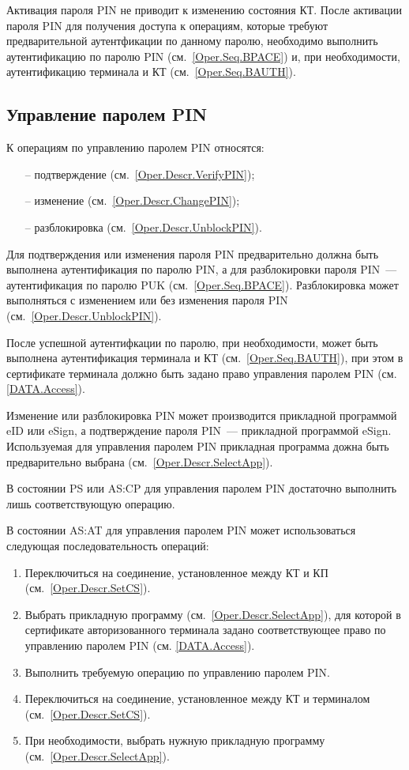 Активация пароля PIN не приводит к изменению состояния КТ.
После активации пароля PIN для получения доступа к
операциям, которые требуют предварительной
аутентфикации по данному паролю, необходимо выполнить аутентификацию 
по паролю PIN (см.~\ref{Oper.Seq.BPACE}) и, при необходимости, 
аутентификацию терминала и КТ (см.~\ref{Oper.Seq.BAUTH}).

\subsection{Управление паролем PIN}
\label{Oper.Seq.ControlPIN}

К операциям по управлению паролем PIN относятся:
\begin{itemize} 
\item[--] подтверждение (см.~\ref{Oper.Descr.VerifyPIN});
\item[--] изменение (см.~\ref{Oper.Descr.ChangePIN});
\item[--] разблокировка (см.~\ref{Oper.Descr.UnblockPIN}).
\end{itemize}

Для подтверждения или изменения пароля PIN предварительно 
должна быть выполнена аутентификация по 
паролю PIN, а для разблокировки пароля PIN~---
аутентификация по паролю PUK (см.~\ref{Oper.Seq.BPACE}).
Разблокировка может выполняться с изменением или без 
изменения пароля PIN (см.~\ref{Oper.Descr.UnblockPIN}).

После успешной аутентифкации по паролю,
при необходимости, может быть выполнена аутентификация 
терминала и КТ (см.~\ref{Oper.Seq.BAUTH}),
при этом в сертификате терминала должно быть задано право
управления паролем PIN (см. \ref{DATA.Access}).

Изменение или разблокировка PIN может
производится прикладной программой eID или eSign,
а подтверждение пароля PIN~--- прикладной программой eSign.
Используемая для управления паролем PIN прикладная
программа дожна быть предварительно 
выбрана (см.~\ref{Oper.Descr.SelectApp}). 

В состоянии PS или AS:CP для управления паролем PIN
достаточно выполнить лишь соответствующую операцию.

В состоянии AS:AT для управления паролем PIN может
использоваться следующая последовательность операций:
%
\begin{enumerate} 
\item Переключиться на соединение,
      установленное между КТ и КП (см.~\ref{Oper.Descr.SetCS}).
\item Выбрать прикладную программу (см.~\ref{Oper.Descr.SelectApp}),
      для которой в сертификате авторизованного терминала задано 
      соответствующее право по управлению паролем PIN (см. \ref{DATA.Access}).
\item Выполнить требуемую операцию по управлению паролем PIN.
\item Переключиться на соединение, установленное между КТ 
      и терминалом (см.~\ref{Oper.Descr.SetCS}).
\item При необходимости, выбрать нужную прикладную программу (см.~\ref{Oper.Descr.SelectApp}).
\end{enumerate}


